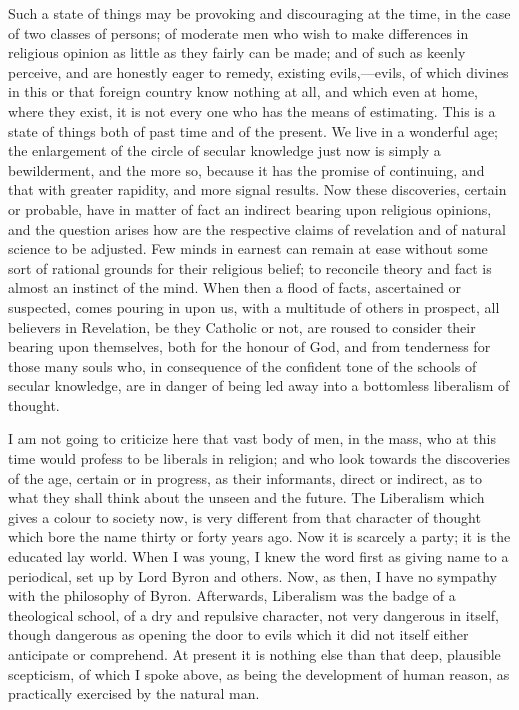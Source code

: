 Such a state of things may be provoking and discouraging at the time,
in the case of two classes of persons; of moderate men who wish to make
differences in religious opinion as little as they fairly can be made;
and of such as keenly perceive, and are honestly eager to remedy,
existing evils,—evils, of which divines in this or that foreign
country know nothing at all, and which even at home, where they
exist, it is not every one who has the means of estimating. This is
a state of things both of past time and of the present. We live in a
wonderful age; the enlargement of the circle of secular knowledge just
now is simply a bewilderment, and the more so, because it has the
promise of continuing, and that with greater rapidity, and more signal
results. Now these discoveries, certain or probable, have in matter of
fact an indirect bearing upon religious opinions, and the question
arises how are the respective claims of revelation and of natural
science to be adjusted. Few minds in earnest can remain at ease without
some sort of rational grounds for their religious belief; to reconcile
theory and fact is almost an instinct of the mind. When then a flood of
facts, ascertained or suspected, comes pouring in upon us, with a
multitude of others in prospect, all believers in Revelation,
be they Catholic or not, are roused to consider their bearing upon
themselves, both for the honour of God, and from tenderness for those
many souls who, in consequence of the confident tone of the schools of
secular knowledge, are in danger of being led away into a bottomless
liberalism of thought.

I am not going to criticize here that vast body of men, in the mass,
who at this time would profess to be liberals in religion; and who look
towards the discoveries of the age, certain or in progress, as their
informants, direct or indirect, as to what they shall think about the
unseen and the future. The Liberalism which gives a colour to society
now, is very different from that character of thought which bore the
name thirty or forty years ago. Now it is scarcely a
party; it is the educated lay world. When I was young, I knew the word
first as giving name to a periodical, set up by Lord Byron and others.
Now, as then, I have no sympathy with the philosophy of Byron.
Afterwards, Liberalism was the badge of a theological school, of a dry
and repulsive character, not very dangerous in itself, though dangerous
as opening the door to evils which it did not itself either anticipate
or comprehend. At present it is nothing else than that deep,
plausible scepticism, of which I spoke above, as being the development
of human reason, as practically exercised by the natural man.

